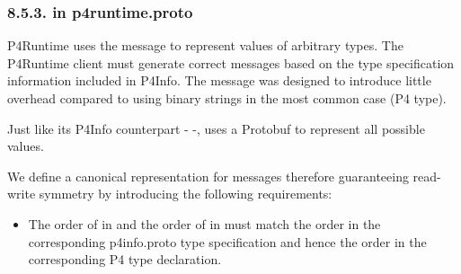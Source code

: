 \documentclass[11pt]{article}
\begin{document}
{%
\subsubsection{8.5.3.\hspace*{0.5em} in p4runtime.proto}\label{sec-p4data-in-p4runtime-proto}%

\noindent{}P4Runtime uses the  message to represent values of arbitrary types. The
P4Runtime client must generate correct  messages based on the type
specification information included in P4Info. The  message was designed
to introduce little overhead compared to using binary strings in the most common
case (P4  type).%

Just like its P4Info counterpart -  -,  uses a Protobuf
 to represent all possible values.%

We define a canonical representation for  messages \textemdash{} therefore
guaranteeing read-write symmetry \textemdash{} by introducing the following requirements:%

\begin{itemize}%

\item{}
The order of  in  and the order of  in
 must match the order in the corresponding p4info.proto type
specification and hence the order in the corresponding P4 type
declaration.%


\end{itemize}}
\end{document}
